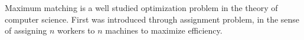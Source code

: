 Maximum matching is a well studied optimization problem in the theory of computer science. First was introduced through assignment problem, in the sense of assigning $n$ workers to $n$ machines to maximize efficiency. 
